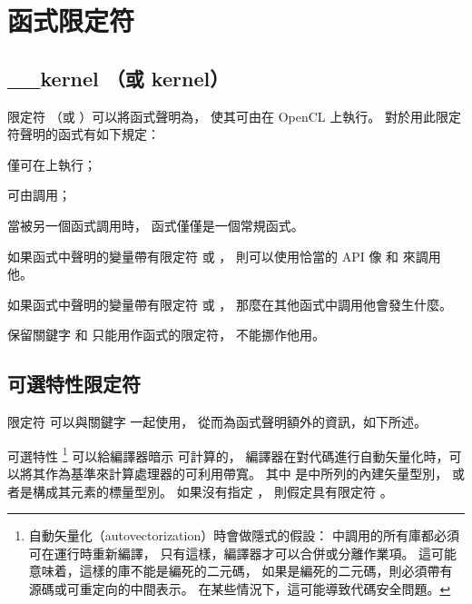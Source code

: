 \section[sec:funcQlf]{函式限定符}

\subsection{__kernel （或 kernel）}

限定符  （或 ）可以將函式聲明為，
使其可由在 OpenCL 上執行。
對於用此限定符聲明的函式有如下規定：
\startigBase
\item 僅可在上執行；
\item 可由調用；
\item 當被另一個函式調用時，  函式僅僅是一個常規函式。
\stopigBase

\startnotepar
如果函式中聲明的變量帶有限定符  或 ，
則可以使用恰當的 API
 像  和  來調用他。

如果函式中聲明的變量帶有限定符  或 ，
那麼在其他函式中調用他會發生什麼。

保留關鍵字  和  只能用作函式的限定符，
不能挪作他用。
\stopnotepar

\subsection[sec:optAttrQlf]{可選特性限定符}

限定符  可以與關鍵字  一起使用，
從而為函式聲明額外的資訊，如下所述。

可選特性 \footnote{
自動矢量化（autovectorization）時會做隱式的假設：
  中調用的所有庫都必須可在運行時重新編譯，
只有這樣，編譯器才可以合併或分離作業項。
這可能意味着，這樣的庫不能是編死的二元碼，
如果是編死的二元碼，則必須帶有源碼或可重定向的中間表示。
在某些情況下，這可能導致代碼安全問題。}
 可以給編譯器暗示  可計算的{}，
編譯器在對代碼進行自動矢量化時，可以將其作為基準來計算處理器的可利用帶寬。
其中  是中所列的內建矢量型別，
或者是構成其元素的標量型別。
如果沒有指定 ，
則假定具有限定符 。

